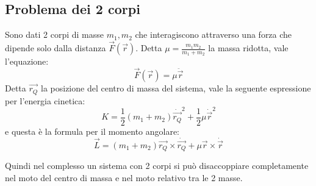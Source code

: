 \documentclass[../main.tex]{subfiles}
\begin{document}
\subsection{Problema dei 2 corpi}
Sono dati 2 corpi di masse $m_1,m_2$ che interagiscono attraverso una forza che dipende 
solo dalla distanza $\vec F(\vec r)$.
Detta $\mu=\frac{m_1m_2}{m_1+m_2}$ la massa ridotta, vale l'equazione:
\begin{equation}\label{ForzaMassaRidotta}
	\vec F(\vec r)=\mu \ddot {\vec{r}}
\end{equation}
Detta $\overrightarrow{ r_Q }$ la posizione del centro di massa del sistema, vale la seguente espressione per l'energia cinetica:
\begin{equation}\label{Cinetica2Corpi}
	K=\frac12(m_1+m_2)\dot{\overrightarrow{r_Q}}^2+\frac12\mu\dot{\vec{r}}^2
\end{equation}
e questa è la formula per il momento angolare:
\begin{equation}\label{Momento2Corpi}
	\vec L=(m_1+m_2)\overrightarrow{r_Q}\times \dot{\overrightarrow{r_Q}}+\mu \vec r\times\dot{\vec r}
\end{equation}

Quindi nel complesso un sistema con 2 corpi si può disaccoppiare completamente nel moto del centro di massa e nel
moto relativo tra le 2 masse.
\end{document}
